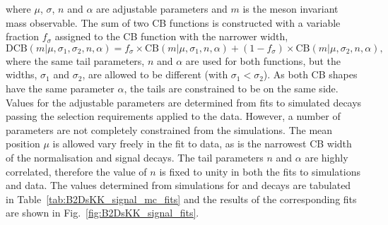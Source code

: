 where $\mu$, $\sigma$, $n$ and $\alpha$ are adjustable parameters and $m$ is the \B meson invariant mass observable.
The sum of two CB functions is constructed with a variable fraction $f_\sigma$ assigned to the CB function with the narrower width,
\begin{equation}
\text{DCB}(m|\mu,\sigma_1,\sigma_2,n,\alpha) = f_\sigma \times \text{CB}(m|\mu,\sigma_1,n,\alpha) + (1-f_\sigma) \times \text{CB}(m|\mu,\sigma_2,n,\alpha),
\label{eq:DoubleBD}
\end{equation}
where the same tail parameters, $n$ and $\alpha$ are used for both functions, but the widths, $\sigma_1$ and $\sigma_2$, are allowed to be different (with $\sigma_1 < \sigma_2$).
As both CB shapes have the same parameter $\alpha$, the tails are constrained to be on the same side.
Values for the adjustable parameters are determined from fits to simulated decays passing the selection requirements applied to the data. 
However, a number of parameters are not completely constrained from the simulations. The mean position $\mu$ is allowed vary freely in the fit to data, as is the narrowest CB width of the normalisation and signal decays. 
The tail parameters $n$ and $\alpha$ are highly correlated, therefore the value of $n$ is fixed to unity in both the fits to simulations and data. The values determined from simulations for \decay{\Bp}{\Dsp\Dzb} and \decay{\Bp}{\Dsp\Kp\Km} decays are tabulated in Table~\ref{tab:B2DsKK_signal_mc_fits} and the results of the corresponding fits are shown in Fig.~\ref{fig:B2DsKK_signal_fits}.


